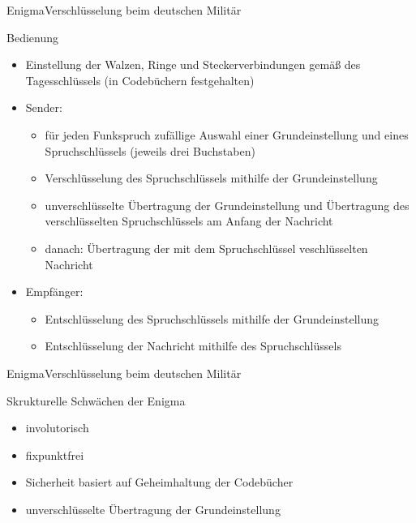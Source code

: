 \documentclass{beamer}
\theoremstyle{plain}
\begin{document}
  
    \begin{frame}{Enigma}{Verschlüsselung beim deutschen Militär} 
  
   \begin{block}{Bedienung}
      \begin{itemize}[<+->]
       \item Einstellung der Walzen, Ringe und Steckerverbindungen gemäß des Tagesschlüssels (in Codebüchern festgehalten)
       \item Sender: 
           \begin{itemize}[<+->]
           \item für jeden Funkspruch zufällige Auswahl einer Grundeinstellung und eines Spruchschlüssels (jeweils drei Buchstaben)
          \item Verschlüsselung des Spruchschlüssels mithilfe der Grundeinstellung
          
	  \item unverschlüsselte Übertragung der Grundeinstellung und Übertragung des verschlüsselten Spruchschlüssels am Anfang der Nachricht
	  \item danach: Übertragung der mit dem Spruchschlüssel veschlüsselten Nachricht
	  \end{itemize}
       \item Empfänger:
        \begin{itemize}[<+->]
        \item Entschlüsselung des Spruchschlüssels mithilfe der Grundeinstellung
        \item Entschlüsselung der Nachricht mithilfe des Spruchschlüssels
        \end{itemize}
      \end{itemize}

   \end{block}

  \end{frame}
  
  
   \begin{frame}{Enigma}{Verschlüsselung beim deutschen Militär} 
    \begin{block}{Skrukturelle Schwächen der Enigma}
     \begin{itemize}
      \item involutorisch
      \item fixpunktfrei
      \item Sicherheit basiert auf Geheimhaltung der Codebücher
      \item unverschlüsselte Übertragung der Grundeinstellung
     \end{itemize}
     \end{block}
 \end{frame}
 
\end{document}
